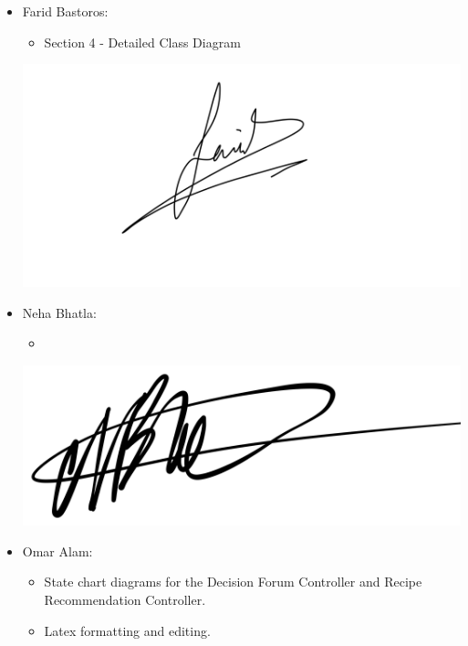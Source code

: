 \documentclass[]{article}
\begin{document}
\begin{itemize}
	\item Farid Bastoros:
	\begin{itemize} 
		\item Section 4 - Detailed Class Diagram
	\end{itemize}
	\includegraphics[scale=0.09]{Farid Bastoros - Signature.jpeg}\\ 
	\item Neha Bhatla:
	\begin{itemize} 
		\item 
	\end{itemize}
	\includegraphics[scale=0.05]{neha_signature.jpeg}\\ 
	\item Omar Alam:
	\begin{itemize}
		\item State chart diagrams for the Decision Forum Controller and Recipe Recommendation Controller.
        \item Latex formatting and editing.
    

\end{itemize}
\end{itemize}
\end{document}
